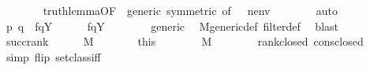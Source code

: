 \begin{isabellebody}
\ \ \ \ \ \ \isamarkupfalse%
\ truth{\isacharunderscore}{\kern0pt}lemma{\isacharbrackleft}{\kern0pt}OF\ {\isacartoucheopen}{\isasymphi}{\isasymin}{\isacharunderscore}{\kern0pt}{\isacartoucheclose}\ generic{\isacharcomma}{\kern0pt}\ symmetric{\isacharcomma}{\kern0pt}\ of\ {\isachardoublequoteopen}{\isacharbrackleft}{\kern0pt}{\isasymrho}{\isacharcomma}{\kern0pt}{\isasymsigma}{\isacharbrackright}{\kern0pt}\ {\isacharat}{\kern0pt}\ nenv{\isachardoublequoteclose}{\isacharbrackright}{\kern0pt}\isanewline
\ \ \ \ \ \ \isamarkupfalse%
\ auto\isanewline
\ \ \ \ \isamarkupfalse%
\ {\isacartoucheopen}{\isasymlangle}{\isasymrho}{\isacharcomma}{\kern0pt}p{\isasymrangle}{\isasymin}{\isasympi}{\isacharprime}{\kern0pt}{\isacartoucheclose}\ {\isacartoucheopen}{\isasymlangle}{\isasymrho}{\isacharcomma}{\kern0pt}q{\isasymrangle}{\isasymin}{\isacharquery}{\kern0pt}{\isasympi}\ {\isasymLongrightarrow}\ f{\isacharparenleft}{\kern0pt}{\isasymlangle}{\isasymrho}{\isacharcomma}{\kern0pt}q{\isasymrangle}{\isacharparenright}{\kern0pt}{\isasymin}Y{\isacartoucheclose}\isanewline
\ \ \ \ \isamarkupfalse%
\ {\isachardoublequoteopen}f{\isacharparenleft}{\kern0pt}{\isasymlangle}{\isasymrho}{\isacharcomma}{\kern0pt}q{\isasymrangle}{\isacharparenright}{\kern0pt}{\isasymin}Y{\isachardoublequoteclose}\isanewline
\ \ \ \ \ \ \isamarkupfalse%
\ generic\ \isamarkupfalse%
\ M{\isacharunderscore}{\kern0pt}generic{\isacharunderscore}{\kern0pt}def\ filter{\isacharunderscore}{\kern0pt}def\ \isamarkupfalse%
\ blast\isanewline
\ \ \ \ \isamarkupfalse%
\ {\isacharquery}{\kern0pt}{\isasymalpha}{\isacharequal}{\kern0pt}{\isachardoublequoteopen}succ{\isacharparenleft}{\kern0pt}rank{\isacharparenleft}{\kern0pt}{\isasymsigma}{\isacharparenright}{\kern0pt}{\isacharparenright}{\kern0pt}{\isachardoublequoteclose}\isanewline
\ \ \ \ \isamarkupfalse%
\ {\isacartoucheopen}{\isasymsigma}{\isasymin}M{\isacartoucheclose}\isanewline
\ \ \ \ \isamarkupfalse%
\ \isamarkupfalse%
\ this\isanewline
\ \ \ \ \isamarkupfalse%
\ {\isachardoublequoteopen}{\isacharquery}{\kern0pt}{\isasymalpha}\ {\isasymin}\ M{\isachardoublequoteclose}\isanewline
\ \ \ \ \ \ \isamarkupfalse%
\ rank{\isacharunderscore}{\kern0pt}closed\ cons{\isacharunderscore}{\kern0pt}closed\ \isamarkupfalse%
\ {\isacharparenleft}{\kern0pt}simp\ flip{\isacharcolon}{\kern0pt}\ setclass{\isacharunderscore}{\kern0pt}iff{\isacharparenright}{\kern0pt}\isanewline

\end{isabellebody}

